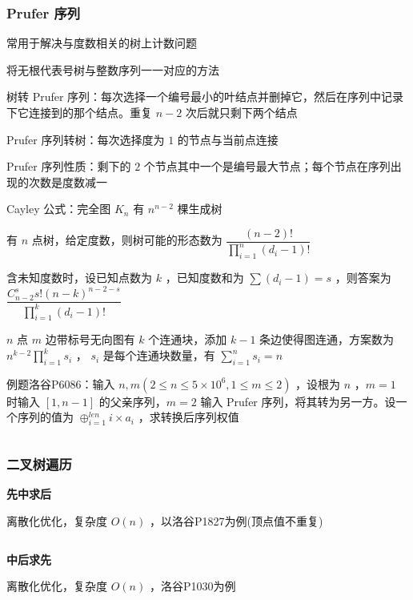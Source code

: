 \documentclass[twocolumn,10pt]{ctexart}
\makeatletter
\newcommand{\hfive}[1]{\par\addvspace{6pt}\@afterindentfalse
  {\noindent\bfseries\normalsize #1}\par\nobreak\vspace{2pt}}
\makeatother
\begin{document}
\inputminted{cpp}{code/ext_032.cpp}

\subsubsection{Prufer 序列}

常用于解决与度数相关的树上计数问题

将无根代表号树与整数序列一一对应的方法

树转 Prufer 序列：每次选择一个编号最小的叶结点并删掉它，然后在序列中记录下它连接到的那个结点。重复 $n-2$ 次后就只剩下两个结点

Prufer 序列转树：每次选择度为 $1$ 的节点与当前点连接

Prufer 序列性质：剩下的 $2$ 个节点其中一个是编号最大节点；每个节点在序列出现的次数是度数减一

Cayley 公式：完全图 $K_n$ 有 $n^{n-2}$ 棵生成树

\begin{notebox}
有 $n$ 点树，给定度数，则树可能的形态数为 $\dfrac{(n-2)!}{\prod_{i=1}^n(d_i-1)!}$

含未知度数时，设已知点数为 $k$ ，已知度数和为 $\sum(d_i-1)=s$ ，则答案为 $\dfrac{C_{n-2}^ss!(n-k)^{n-2-s}}{\prod_{i=1}^k(d_i-1)!}$

$n$ 点 $m$ 边带标号无向图有 $k$ 个连通块，添加 $k-1$ 条边使得图连通，方案数为 $n^{k-2}\prod_{i=1}^k s_i$ ， $s_i$ 是每个连通块数量，有 $\sum_{i=1}^ns_i=n$

例题洛谷P6086：输入 $n,\allowbreak{}m(2\le n\le5\times10^6,\allowbreak{}1\le m\le2)$ ，设根为 $n$ ，$m=1$ 时输入 $[1,n-1]$ 的父亲序列，$m=2$ 输入 Prufer 序列，将其转为另一方。设一个序列的值为 $\oplus_{i=1}^{len}i\times a_i$ ，求转换后序列权值
\end{notebox}

\inputminted{cpp}{code/p6086_prufer.cpp}

\subsubsection{二叉树遍历}

\hfive{先中求后}

离散化优化，复杂度 $O(n)$ ，以洛谷P1827为例(顶点值不重复)

\inputminted{cpp}{code/p1827_pre_mid_to_post.cpp}

\hfive{中后求先}

离散化优化，复杂度 $O(n)$ ，洛谷P1030为例

\inputminted{cpp}{code/p1030_mid_post_to_pre.cpp}
\end{document}
